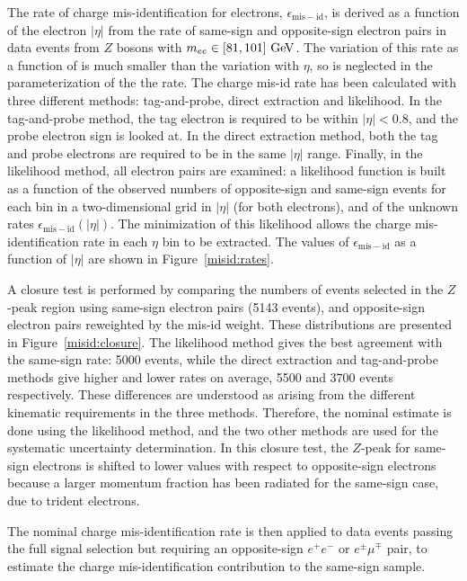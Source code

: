 The rate of charge mis-identification for electrons,
$\epsilon_{\mathrm{mis-id}}$, is derived as a function of the electron $|\eta|$
from the rate of same-sign and opposite-sign electron pairs in data
events from $Z$ bosons with $m_{ee} \in [81, 101] \GeV$. The variation of this rate as a 
function of \pT{} is much smaller than the variation with $\eta$, so is neglected in 
the parameterization of the the rate. The charge mis-id rate has been
calculated with three different methods: tag-and-probe, direct
extraction and likelihood. In the tag-and-probe method, the tag
electron is required to be within $|\eta| < 0.8$, and the probe electron
sign is looked at. In the direct extraction method,
both the tag and probe electrons are required to be in the same
$|\eta|$ range. Finally, in the likelihood method, all electron pairs
are examined: a likelihood function is built as a function of the observed numbers of
opposite-sign and same-sign events for each bin in a two-dimensional grid in $|\eta|$ (for both
electrons), and of
the unknown rates $\epsilon_{\mathrm{mis-id}}(|\eta|)$.
The minimization of this likelihood allows the charge mis-identification rate in each
$\eta$ bin to be extracted.
The values of $\epsilon_{\mathrm{mis-id}}$ as a
function of $|\eta|$ are shown in Figure~\ref{misid:rates}.

A closure test is performed by comparing the numbers of events selected in the $Z$-peak 
region using same-sign electron pairs (5143 events), and 
opposite-sign electron pairs reweighted by the mis-id weight. These distributions are presented
in Figure~\ref{misid:closure}. The likelihood method gives the best agreement with the 
same-sign rate: 5000 events,
while the direct extraction and tag-and-probe methods give higher 
and lower rates on average, 5500 and 3700 events respectively.
These differences are understood as arising from the different kinematic requirements
in the three methods. 
Therefore, the nominal estimate is done using the likelihood method, and the two other methods are
used for the systematic uncertainty determination. In this closure test,
the $Z$-peak for same-sign electrons is shifted to lower values with respect 
to opposite-sign electrons because a larger momentum fraction has been radiated for the same-sign case,
due to trident electrons.

The nominal charge mis-identification rate is then applied to data events passing the full signal 
selection but requiring an opposite-sign $e^+e^-$ or 
$e^{\pm}\mu^{\mp}$ pair, to estimate the charge mis-identification contribution to the same-sign sample.

